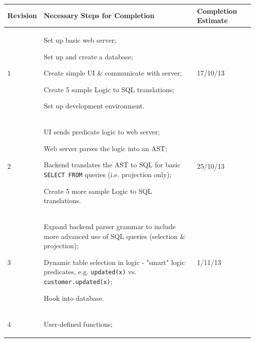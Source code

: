 \documentclass[a4paper, 11pt]{article}
\begin{document}
    \begin{table}[H]
      \centering
      \begin{tabular}{| l | p{} | l |}
        \hline
        \textbf{Revision} & \textbf{Necessary Steps for Completion}
          & \textbf{Completion Estimate} \\
        \hline
        1 &
          \begin{compactitem}
            \item Set up basic web server;
            \item Set up and create a database;
            \item Create simple UI \& communicate with server;
            \item Create 5 sample Logic to SQL translations;
            \item Set up development environment.
          \end{compactitem}
          & 17/10/13 \\
        \hline
        2 &
          \begin{compactitem}
            \item UI sends predicate logic to web server;
            \item Web server parses the logic into an AST;
            \item Backend translates the AST to SQL for basic \texttt{SELECT
              FROM} queries (i.e. projection only);
            \item Create 5 more sample Logic to SQL translations.
          \end{compactitem}
          & 25/10/13 \\
        \hline
        3 &
          \begin{compactitem}
            \item Expand backend parser grammar to include more advanced use of
              SQL queries (selection \& projection);
            \item Dynamic table selection in logic - "smart" logic predicates,
              e.g. \texttt{updated(x)} vs. \texttt{customer.updated(x)};
            \item Hook into database.
          \end{compactitem}
          & 1/11/13 \\
        \hline
        4 &
          \begin{compactitem}
            \item User-defined functions;

\end{compactitem}
\end{tabular}
\end{table}
\end{document}
